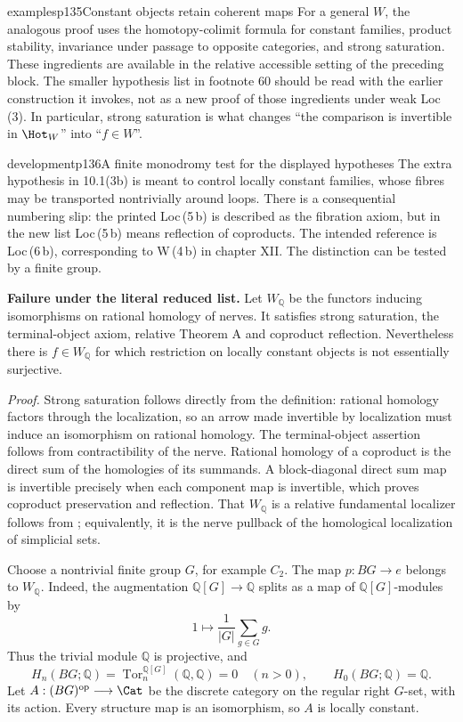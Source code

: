 \begin{dcomment}{examples}{p135}{Constant objects retain coherent maps}
For a general $W$, the analogous proof uses the homotopy-colimit formula for constant families, product stability, invariance under passage to opposite categories, and strong saturation. These ingredients are available in the relative accessible setting of the preceding block. The smaller hypothesis list in footnote 60 should be read with the earlier construction it invokes, not as a new proof of those ingredients under weak Loc\,(3). In particular, strong saturation is what changes ``the comparison is invertible in $\Hot_W$'' into ``$f\in W$''.
\end{dcomment}

\begin{dcomment}{development}{p136}{A finite monodromy test for the displayed hypotheses}
The extra hypothesis in 10.1(3b) is meant to control locally constant families, whose fibres may be transported nontrivially around loops. There is a consequential numbering slip: the printed Loc\,(5\,b) is described as the fibration axiom, but in the new list Loc\,(5\,b) means reflection of coproducts. The intended reference is Loc\,(6\,b), corresponding to W\,(4\,b) in chapter XII. The distinction can be tested by a finite group.

\textbf{Failure under the literal reduced list.}\ours
Let $W_{\mathbb Q}$ be the functors inducing isomorphisms on rational homology of nerves. It satisfies strong saturation, the terminal-object axiom, relative Theorem A and coproduct reflection. Nevertheless there is $f\in W_{\mathbb Q}$ for which restriction on locally constant objects is not essentially surjective.

\emph{Proof.} Strong saturation follows directly from the definition: rational homology factors through the localization, so an arrow made invertible by localization must induce an isomorphism on rational homology. The terminal-object assertion follows from contractibility of the nerve. Rational homology of a coproduct is the direct sum of the homologies of its summands. A block-diagonal direct sum map is invertible precisely when each component map is invertible, which proves coproduct preservation and reflection. That $W_{\mathbb Q}$ is a relative fundamental localizer follows from \citet[Corollary 9.4.3 and \S9.4.4]{Cisinski2006}; equivalently, it is the nerve pullback of the homological localization of simplicial sets.

Choose a nontrivial finite group $G$, for example $C_2$. The map $p:BG\longrightarrow e$ belongs to $W_{\mathbb Q}$. Indeed, the augmentation $\mathbb Q[G]\longrightarrow\mathbb Q$ splits as a map of $\mathbb Q[G]$-modules by
\[
 1\longmapsto\frac1{|G|}\sum_{g\in G}g.
\]
Thus the trivial module $\mathbb Q$ is projective, and
\[
 H_n(BG;\mathbb Q)=
 \operatorname{Tor}^{\mathbb Q[G]}_n(\mathbb Q,\mathbb Q)=0\quad(n>0),
 \qquad H_0(BG;\mathbb Q)=\mathbb Q.
\]
Let $A:(BG)^{\mathrm{op}}\longrightarrow\Cat$ be the discrete category on the regular right $G$-set, with its action. Every structure map is an isomorphism, so $A$ is locally constant.


\end{dcomment}
